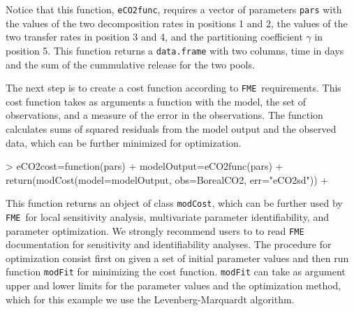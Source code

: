 \documentclass[a4paper]{article}
\newcommand{\FME}{\texttt{FME}}
\begin{document}
Notice that this function, {\tt eCO2func}, requires a vector of parameters {\tt pars} with the values of the two decomposition rates in positions 1 and 2, the values of the two transfer rates in position 3 and 4, and the partitioning coefficient $\gamma$ in position 5. This function returns a {\tt data.frame} with two columns, time in days and the sum of the cummulative release for the two pools. 

The next step is to create a cost function according to \FME \, requirements. This cost function takes as arguments a function with the model, the set of observations, and a measure of the error in the observations. The function calculates sums of squared residuals from the model output and the observed data, which can be further minimized for optimization. 

\begin{Schunk}
\begin{Sinput}
> eCO2cost=function(pars){
+   modelOutput=eCO2func(pars)
+   return(modCost(model=modelOutput, obs=BorealCO2, err="eCO2sd"))
+ }
\end{Sinput}
\end{Schunk}

This function returns an object of class {\tt modCost}, which can be further used by \FME \, for local sensitivity analysis, multivariate parameter identifiability, and parameter optimization. We strongly recommend users to to read \FME \, documentation for sensitivity and identifiability analyses. The procedure for optimization consist first on given a set of initial parameter values and then run function {\tt modFit} for minimizing the cost function. {\tt modFit} can take as argument upper and lower limits for the parameter values and the optimization method, which for this example we use the Levenberg-Marquardt algorithm.
\end{document}
